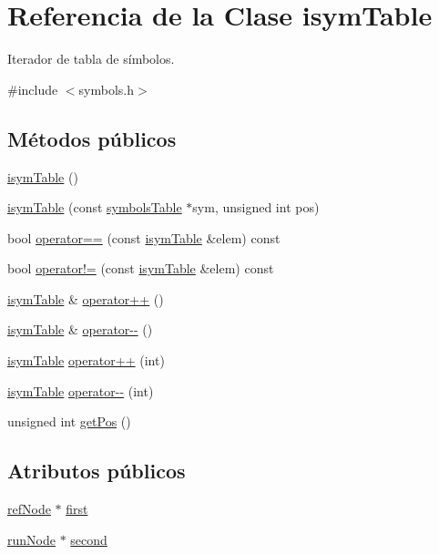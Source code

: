 \hypertarget{classisymTable}{\section{Referencia de la Clase isym\-Table}
\label{classisymTable}
}


Iterador de tabla de símbolos.  




{\ttfamily \#include $<$symbols.\-h$>$}

\subsection*{Métodos públicos}
\begin{DoxyCompactItemize}
\item 
\hyperlink{classisymTable_acf5e41652ff2cf18a1da8f4495ed5dba}{isym\-Table} ()
\item 
\hyperlink{classisymTable_ad04189ea0dc999015f14b1cc2670d6bb}{isym\-Table} (const \hyperlink{classsymbolsTable}{symbols\-Table} $\ast$sym, unsigned int pos)
\item 
bool \hyperlink{classisymTable_aca68c12e7f3a31c9388555ce9a79ed36}{operator==} (const \hyperlink{classisymTable}{isym\-Table} \&elem) const 
\item 
bool \hyperlink{classisymTable_a37ab3100bc72407cb3cd113d9f080e9e}{operator!=} (const \hyperlink{classisymTable}{isym\-Table} \&elem) const 
\item 
\hyperlink{classisymTable}{isym\-Table} \& \hyperlink{classisymTable_a0683f710cec56bba6f51948bb84ab9b4}{operator++} ()
\item 
\hyperlink{classisymTable}{isym\-Table} \& \hyperlink{classisymTable_a0744c09a77ed9333b69c3a0018bc172b}{operator-\/-\/} ()
\item 
\hyperlink{classisymTable}{isym\-Table} \hyperlink{classisymTable_a2025c24526c2c22bdbec4de6abf29259}{operator++} (int)
\item 
\hyperlink{classisymTable}{isym\-Table} \hyperlink{classisymTable_a58e0f9a55653b0ca7958b9ee1658a726}{operator-\/-\/} (int)
\item 
unsigned int \hyperlink{classisymTable_a6754473e849e3336cbeed51dc855575e}{get\-Pos} ()
\end{DoxyCompactItemize}
\subsection*{Atributos públicos}
\begin{DoxyCompactItemize}
\item 
\hyperlink{classrefNode}{ref\-Node} $\ast$ \hyperlink{classisymTable_ac68f0998e071800e96f90150cee06cbc}{first}
\item 
\hyperlink{classrunNode}{run\-Node} $\ast$ \hyperlink{classisymTable_a34ea5520bff342eef9a3770e9dad1073}{second}
\end{DoxyCompactItemize}


